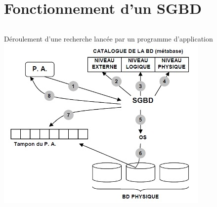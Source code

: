 \documentclass[10pt]{beamer}
\begin{document}
\section{Fonctionnement d’un SGBD}
\begin{frame}{\secname }
    \begin{columns}
        Déroulement d’une recherche lancée par un programme d’application
        \includegraphics[width=0.8\linewidth]{../assets/img/architecture_sgbd--7.jpg}
    \end{columns}
\end{frame}
\end{document}
